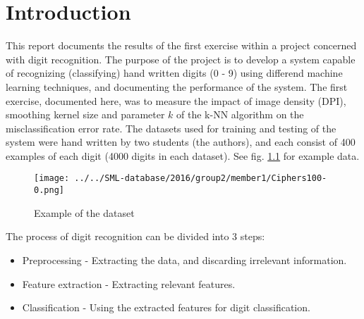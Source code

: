 \chapter{Introduction}
This report documents the results of the first exercise within
a project concerned with digit recognition.
The purpose of the project is to develop a system capable of recognizing
(classifying) hand written digits (0 - 9) using differend machine learning techniques,
and documenting the performance of the system.
The first exercise, documented here, was to measure the impact
of image density (DPI), smoothing kernel size and parameter \(k\)
of the k-NN algorithm on the misclassification error rate.
The datasets used for training and testing of the system
were hand written by two students (the authors), and each
consist of 400 examples of each digit (4000 digits in each dataset).
See fig. \ref{fig:data} for example data.

\begin{figure}[H]
\centering
\texttt{[image: ../../SML-database/2016/group2/member1/Ciphers100-0.png]}
\caption{Example of the  dataset}
\label{fig:data}
\end{figure} 

The process of digit recognition can be divided into 3 steps:
\begin{itemize}
\item Preprocessing - Extracting the data, and discarding irrelevant information. 
\item Feature extraction - Extracting relevant features.
\item Classification - Using the extracted features for digit classification.
\end{itemize}